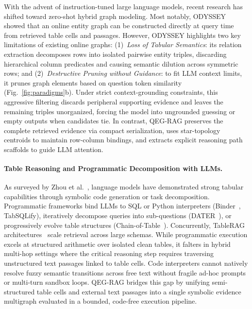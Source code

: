 \documentclass[runningheads]{llncs}
\begin{document}
With the advent of instruction-tuned large language models, recent research has shifted toward zero-shot hybrid graph modeling. Most notably, ODYSSEY~\cite{agarwal2025hybrid} showed that an online entity graph can be constructed directly at query time from retrieved table cells and passages. However, ODYSSEY highlights two key limitations of existing online graphs: (1)~\emph{Loss of Tabular Semantics}: its relation extraction decomposes rows into isolated pairwise entity triples, discarding hierarchical column predicates and causing semantic dilution across symmetric rows; and (2)~\emph{Destructive Pruning without Guidance}: to fit LLM context limits, it prunes graph elements based on question token similarity (Fig.~\ref{fig:paradigms}b). Under strict context-grounding constraints, this aggressive filtering discards peripheral supporting evidence and leaves the remaining triples unorganized, forcing the model into ungrounded guessing or empty outputs when candidates tie. In contrast, QEG-RAG preserves the complete retrieved evidence via compact serialization, uses star-topology centroids to maintain row-column bindings, and extracts explicit reasoning path scaffolds to guide LLM attention.

\paragraph{Table Reasoning and Programmatic Decomposition with LLMs.}
As surveyed by Zhou et al.~\cite{zhou2026tableqasurvey}, language models have demonstrated strong tabular capabilities through symbolic code generation or task decomposition. Programmatic frameworks bind LLMs to SQL or Python interpreters (Binder~\cite{cheng2023binder}, TabSQLify), iteratively decompose queries into sub-questions (DATER~\cite{ye2023dater}), or progressively evolve table structures (Chain-of-Table~\cite{wang2024chainoftable}). Concurrently, TableRAG architectures~\cite{chen2024tablerag,yu2025tablerag} scale retrieval across large schemas. While programmatic execution excels at structured arithmetic over isolated clean tables, it falters in hybrid multi-hop settings where the critical reasoning step requires traversing unstructured text passages linked to table cells. Code interpreters cannot natively resolve fuzzy semantic transitions across free text without fragile ad-hoc prompts or multi-turn sandbox loops. QEG-RAG bridges this gap by unifying semi-structured table cells and external text passages into a single symbolic evidence multigraph evaluated in a bounded, code-free execution pipeline.
\end{document}
